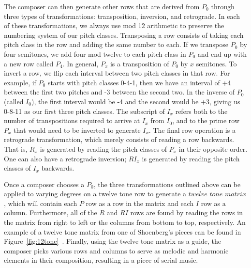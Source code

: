 The composer can then generate other rows that are derived from $P_0$ through three 
types of transformations: transposition, inversion, and retrograde. In each of these 
transformations, we always use mod 12 arithmetic to preserve the numbering system of 
our pitch classes. Transposing a row consists of taking each pitch class in the row and 
adding the same number to each. If we transpose $P_0$ by four semitones, we add four mod 
twelve to each pitch class in $P_0$ and end up with a new row called $P_4$. In general, $P_x$ 
is a transposition of $P_0$ by $x$ semitones. To invert a row, we flip each interval between two 
pitch classes in that row. For example, if $P_0$ starts with pitch classes 0-4-1, then 
we have an interval of +4 between the first two pitches and -3 between the second two. 
In the inverse of $P_0$ (called $I_0$), the first interval would be -4 and the second would
be +3, giving us 0-8-11 as our first three pitch classes. The subscript of $I_x$  refers 
both to the number of transpositions required to arrive at $I_x$ from $I_0$, and to the 
prime row $P_x$ that would need to be inverted to generate $I_x$. The final row operation 
is a retrograde transformation, which merely consists of reading a row backwards. That is, $R_x$
is generated by reading the pitch classes of $P_x$ in their opposite order. One can also 
have a retrograde inversion; $RI_x$ is generated by reading the pitch classes of $I_x$ backwards.


Once a composer chooses a $P_0$, the three transformations outlined above can be applied 
to varying degrees on a twelve tone row to generate a $twelve$ $tone$ $matrix$,
which will contain each $P$ row 
as a row in the matrix and each $I$ row as a column. Furthermore, all of the $R$ and $RI$
rows are found by reading the rows in the matrix from right to left or the columns 
from bottom to top, respectively. An example of a twelve tone matrix from one of Shoenberg's 
pieces can be found in Figure~\ref{fig:12tone}~\cite{devoto2013twelve}. Finally, using the twelve tone 
matrix as a guide, the composer picks various rows and columns to serve as melodic and 
harmonic elements in their composition, resulting in a piece of serial music.


